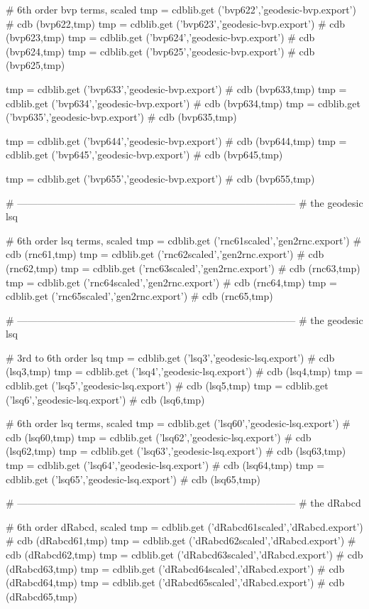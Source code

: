 \documentclass[12pt]{cdblatex}
\begin{document}
\begin{cadabra}
   # 6th order bvp terms, scaled
   tmp = cdblib.get ('bvp622','geodesic-bvp.export')  # cdb (bvp622,tmp)
   tmp = cdblib.get ('bvp623','geodesic-bvp.export')  # cdb (bvp623,tmp)
   tmp = cdblib.get ('bvp624','geodesic-bvp.export')  # cdb (bvp624,tmp)
   tmp = cdblib.get ('bvp625','geodesic-bvp.export')  # cdb (bvp625,tmp)

   tmp = cdblib.get ('bvp633','geodesic-bvp.export')  # cdb (bvp633,tmp)
   tmp = cdblib.get ('bvp634','geodesic-bvp.export')  # cdb (bvp634,tmp)
   tmp = cdblib.get ('bvp635','geodesic-bvp.export')  # cdb (bvp635,tmp)

   tmp = cdblib.get ('bvp644','geodesic-bvp.export')  # cdb (bvp644,tmp)
   tmp = cdblib.get ('bvp645','geodesic-bvp.export')  # cdb (bvp645,tmp)

   tmp = cdblib.get ('bvp655','geodesic-bvp.export')  # cdb (bvp655,tmp)

   # ------------------------------------------------------------------------------------
   # the geodesic lsq

   # 6th order lsq terms, scaled
   tmp = cdblib.get ('rnc61scaled','gen2rnc.export')  # cdb (rnc61,tmp)
   tmp = cdblib.get ('rnc62scaled','gen2rnc.export')  # cdb (rnc62,tmp)
   tmp = cdblib.get ('rnc63scaled','gen2rnc.export')  # cdb (rnc63,tmp)
   tmp = cdblib.get ('rnc64scaled','gen2rnc.export')  # cdb (rnc64,tmp)
   tmp = cdblib.get ('rnc65scaled','gen2rnc.export')  # cdb (rnc65,tmp)

   # ------------------------------------------------------------------------------------
   # the geodesic lsq

   # 3rd to 6th order lsq
   tmp = cdblib.get ('lsq3','geodesic-lsq.export')  # cdb (lsq3,tmp)
   tmp = cdblib.get ('lsq4','geodesic-lsq.export')  # cdb (lsq4,tmp)
   tmp = cdblib.get ('lsq5','geodesic-lsq.export')  # cdb (lsq5,tmp)
   tmp = cdblib.get ('lsq6','geodesic-lsq.export')  # cdb (lsq6,tmp)

   # 6th order lsq terms, scaled
   tmp = cdblib.get ('lsq60','geodesic-lsq.export')  # cdb (lsq60,tmp)
   tmp = cdblib.get ('lsq62','geodesic-lsq.export')  # cdb (lsq62,tmp)
   tmp = cdblib.get ('lsq63','geodesic-lsq.export')  # cdb (lsq63,tmp)
   tmp = cdblib.get ('lsq64','geodesic-lsq.export')  # cdb (lsq64,tmp)
   tmp = cdblib.get ('lsq65','geodesic-lsq.export')  # cdb (lsq65,tmp)

   # ------------------------------------------------------------------------------------
   # the dRabcd

   # 6th order dRabcd, scaled
   tmp = cdblib.get ('dRabcd61scaled','dRabcd.export')  # cdb (dRabcd61,tmp)
   tmp = cdblib.get ('dRabcd62scaled','dRabcd.export')  # cdb (dRabcd62,tmp)
   tmp = cdblib.get ('dRabcd63scaled','dRabcd.export')  # cdb (dRabcd63,tmp)
   tmp = cdblib.get ('dRabcd64scaled','dRabcd.export')  # cdb (dRabcd64,tmp)
   tmp = cdblib.get ('dRabcd65scaled','dRabcd.export')  # cdb (dRabcd65,tmp)


\end{cadabra}
\end{document}
